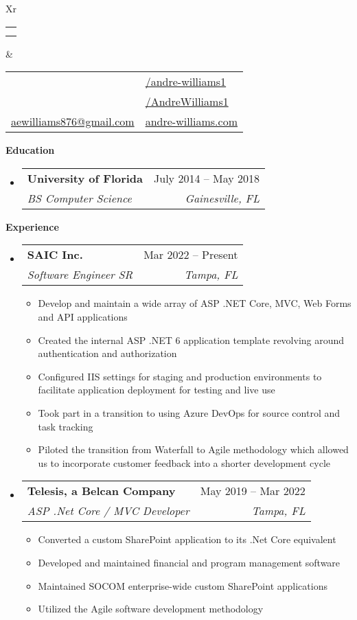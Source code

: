 \documentclass[letterpaper,12pt]{article}[leftmargin=*]
\makeatletter
\def \fullname {Andre Williams}
\def \subtitle {}
\def \linkedinicon {\faLinkedin}
\def \linkedinlink {https://linkedin.com/in/andre-williams1/}
\def \linkedintext {/andre-williams1}
\def \phoneicon {\faPhone}
\def \phonetext {(561) 452-1398}
\def \addressicon {\faMapMarker}
\def \addresstext {7104 S Mascotte St, 33616}
\def \emailicon {\faEnvelope}
\def \emaillink {mailto:aewilliams876@gmail.com}
\def \emailtext {aewilliams876@gmail.com}
\def \githubicon {\faGithub}
\def \githublink {https://github.com/andrewilliams1}
\def \githubtext {/AndreWilliams1}
\def \websiteicon {\faGlobe}
\def \websitelink {andre-williams.com}
\def \websitetext {andre-williams.com}
\def \headertype {\doublecol} %
\def \entryspacing {-0pt}
\def \linkedin {\linkedinicon \hspace{3pt}\href{\linkedinlink}{\linkedintext}}
\def \phone {\phoneicon \hspace{3pt}{ \phonetext}}
\def \address {\addressicon \hspace{3pt}{ \addresstext}}
\def \email {\emailicon \hspace{3pt}\href{\emaillink}{\emailtext}}
\def \github {\githubicon \hspace{3pt}\href{\githublink}{\githubtext}}
\def \website {\websiteicon \hspace{3pt}\href{\websitelink}{\websitetext}}
\renewcommand{\section}[2]{\vspace{5pt}
  \colorbox{secondary}{\color{white}\raggedbottom\normalsize\textbf{{#1}{\hspace{7pt}#2}}}
}
\newcommand{\resumeEntryStart}{\begin{itemize}[leftmargin=2.5mm]}
\newcommand{\resumeEntryEnd}{\end{itemize}\vspace{\entryspacing}}
\newcommand{\resumeItemListStart}{\begin{itemize}[leftmargin=4.5mm]}
\newcommand{\resumeItemListEnd}{\end{itemize}}
\newcommand{\resumeItem}[1]{
  \item\small{
    {#1 \vspace{-2pt}}
  }
}
\newcommand{\resumeEntryTSDL}[4]{
  \vspace{-1pt}\item[]
    \begin{tabularx}{0.97\textwidth}{X@{\hspace{60pt}}r}
      \textbf{\color{primary}#1} & {\firabook\color{accent}\small#2} \\
      \textit{\color{accent}\small#3} & \textit{\color{accent}\small#4} \\
    \end{tabularx}\vspace{-6pt}
}
\newcommand{\doublecol}[6]{
  \begin{tabularx}{\textwidth}{Xr}
    {
      \begin{tabular}[c]{l}
        \fontsize{35}{45}\selectfont{\color{primary}{{\textbf{\fullname}}}} \\
        {\textit{\subtitle}} %
      \end{tabular}
    } & {
      \begin{tabular}[c]{l@{\hspace{1.5em}}l}
        {\small#4} & {\small#1} \\
        {\small#5} & {\small#2} \\
        {\small#6} & {\small#3}
      \end{tabular}
    }
  \end{tabularx}
}
\newcommand{\singlecol}[6]{
  \begin{tabularx}{\textwidth}{Xr}
    {
      \begin{tabular}[b]{l}
        \fontsize{35}{45}\selectfont{\color{primary}{{\textbf{\fullname}}}} \\
        {\textit{\subtitle}} %
      \end{tabular}
    } & {
      \begin{tabular}[c]{l}
        {\small#1} \\
        {\small#2} \\
        {\small#3} \\
        {\small#4} \\
        {\small#5} \\
        {\small#6}
      \end{tabular}
    }
  \end{tabularx}
}
\makeatother
\begin{document}


\headertype{\linkedin}{\github}{\website}{\phone}{\address}{\email}{} %
\vspace{-10pt} %

\section{\faGraduationCap}{Education}

  \resumeEntryStart
    \resumeEntryTSDL
      {University of Florida}{July 2014 -- May 2018}
      {BS Computer Science}{Gainesville, FL}
  \resumeEntryEnd

\section{\faPieChart}{Experience}

 \resumeEntryStart
    \resumeEntryTSDL
      {SAIC Inc.}{Mar 2022 -- Present}
      {Software Engineer SR}{Tampa, FL}
    \resumeItemListStart
      \resumeItem {Develop and maintain a wide array of ASP .NET Core, MVC, Web Forms and API applications}
      \resumeItem {Created the internal ASP .NET 6 application template revolving around authentication and authorization}
      \resumeItem {Configured IIS settings for staging and production environments to facilitate application deployment for testing and live use}
      \resumeItem {Took part in a transition to using Azure DevOps for source control and task tracking}
      \resumeItem {Piloted the transition from Waterfall to Agile methodology which allowed us to incorporate customer feedback into a shorter development cycle}
    \resumeItemListEnd
  \resumeEntryEnd

  \resumeEntryStart
    \resumeEntryTSDL
      {Telesis, a Belcan Company}{May 2019 -- Mar 2022}
      {ASP .Net Core / MVC Developer}{Tampa, FL}
    \resumeItemListStart
      \resumeItem {Converted a custom SharePoint application to its .Net Core equivalent}
      \resumeItem {Developed and maintained financial and program management software}
      \resumeItem {Maintained SOCOM enterprise-wide custom SharePoint applications}
      \resumeItem {Utilized the Agile software development methodology}
    \resumeItemListEnd
  \resumeEntryEnd
\end{document}
